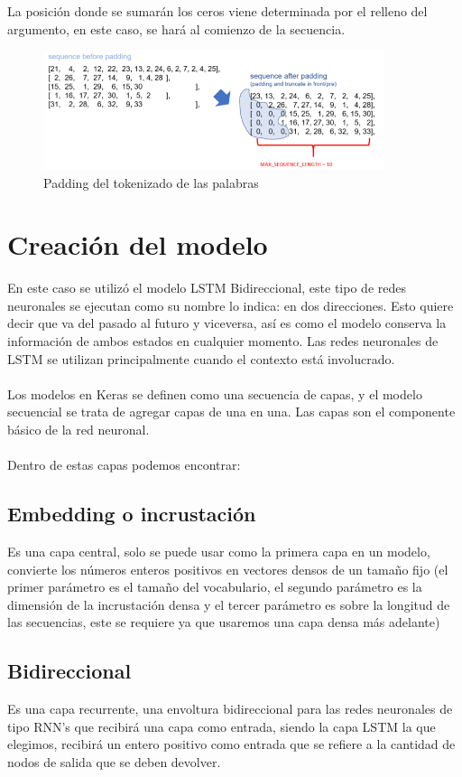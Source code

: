 \documentclass[12pt, a4paper, titlepage]{article}
\begin{document}
	La posición donde se sumarán los ceros viene determinada por el relleno del argumento, en este caso, se hará al comienzo de la secuencia.
	\begin{figure}[H]
		\includegraphics[width=10cm]{./Imagenes/Modelo/padding.png}
		\centering 
		\caption{Padding del tokenizado de las palabras}
	\end{figure}	
	\newpage	
	\section{Creación del modelo}
	En este caso se utilizó el modelo LSTM Bidireccional, este tipo de redes neuronales se ejecutan como su nombre lo indica: en dos direcciones. Esto quiere decir que va del pasado al futuro y viceversa, así es como el modelo conserva la información de ambos estados en cualquier momento. Las redes neuronales de LSTM se utilizan principalmente cuando el contexto está involucrado.\\\\
	Los modelos en Keras se definen como una secuencia de capas, y el modelo secuencial se trata de agregar capas de una en una. Las capas son el componente básico de la red neuronal.\\\\
	Dentro de estas capas podemos encontrar:
	\subsection{Embedding o incrustación}
	Es una capa central, solo se puede usar como la primera capa en un modelo, convierte los números enteros positivos en vectores densos de un tamaño fijo (el primer parámetro es el tamaño del vocabulario, el segundo parámetro es la dimensión de la incrustación densa y el tercer parámetro es sobre la longitud de las secuencias, este se requiere ya que usaremos una capa densa más adelante)
	\begin{center}
		
	\end{center}
	\subsection{Bidireccional}
	Es una capa recurrente, una envoltura bidireccional para las redes neuronales de tipo RNN's que recibirá una capa como entrada, siendo la capa LSTM la que elegimos, recibirá un entero positivo como entrada que se refiere a la cantidad de nodos de salida que se deben devolver.
	\begin{center}
		
	\end{center}
\end{document}
